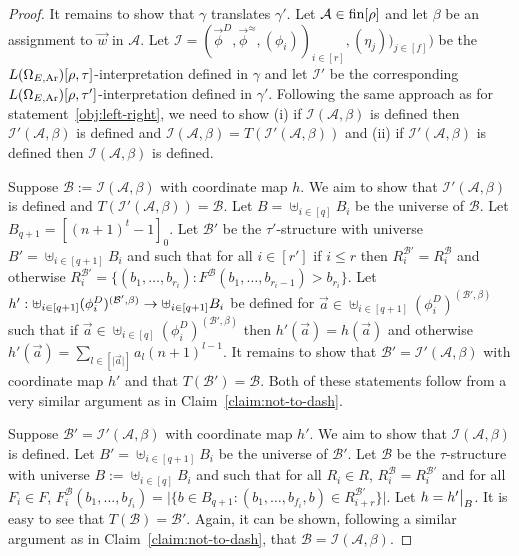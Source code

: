 \documentclass[../main/thesis.tex]{subfiles}
\begin{document}
\begin{proof}
  It remains to show that $\gamma$ translates $\gamma'$. Let $\mathcal{A} \in
  \text{\upshape fin}{[\rho]}$ and let $\beta$ be an assignment to $\vec{w}$ in $\mathcal{A}$.
  Let $\mathcal{I} = (\vec{\phi}^D, \vec{\phi}^{\approx}, (\phi_i))_{i \in [r]},
  (\eta_j))_{j \in [f]})$ be the $L(\Omega_{E, \text{\upshape Ar}})[\rho, \tau]$-interpretation
  defined in $\gamma$ and let $\mathcal{I}'$ be the corresponding $L(\Omega_{E,
    \text{\upshape Ar}})[\rho, \tau']$-interpretation defined in $\gamma'$. Following the same
  approach as for statement~\ref{obj:left-right}, we need to show (i) if
  $\mathcal{I}(\mathcal{A}, \beta)$ is defined then $\mathcal{I}'(\mathcal{A},
  \beta)$ is defined and $\mathcal{I}(\mathcal{A}, \beta) =
  T(\mathcal{I}'(\mathcal{A}, \beta))$ and (ii) if $\mathcal{I}'(\mathcal{A},
  \beta)$ is defined then $\mathcal{I}(\mathcal{A}, \beta)$ is defined.

  Suppose $\mathcal{B} := \mathcal{I}(\mathcal{A}, \beta)$ with coordinate map
  $h$. We aim to show that $\mathcal{I}'(\mathcal{A}, \beta)$ is defined and
  $T(\mathcal{I}'(\mathcal{A}, \beta)) = \mathcal{B}$. Let $B = \uplus_{i \in
    [q]}B_i$ be the universe of $\mathcal{B}$. Let $B_{q + 1} = [(n + 1)^{t} -
  1]_0$. Let $\mathcal{B}'$ be the $\tau'$-structure with universe $B' =
  \uplus_{i \in [q+1]} B_i$ and such that for all $i \in [r']$ if $i \leq r$
  then $R^{\mathcal{B}'}_i = R^{\mathcal{B}}_i$ and otherwise
  $R^{\mathcal{B}'}_i = \{(b_1, \ldots, b_{r_i} ) : F^{\mathcal{B}} (b_1,
  \ldots, b_{r_i - 1}) > b_{r_i}\}$. Let $h' : \uplus_{i \in [q +
    1]}(\phi^D_i)^{(\mathcal{B}', \beta)} \rightarrow \uplus_{i \in [q+1]} B_i$ be
  defined for $\vec{a} \in \uplus_{i \in [q + 1]}(\phi^D_i)^{(\mathcal{B}',
    \beta)}$ such that if $\vec{a} \in \uplus_{i \in
    [q]}(\phi^D_i)^{(\mathcal{B}', \beta)}$ then $h'(\vec{a}) = h(\vec{a})$ and
  otherwise $h'(\vec{a}) = \sum_{l \in [\vert \vec{a} \vert]} a_l (n + 1)^{l -
    1}$. It remains to show that $\mathcal{B}' = \mathcal{I}'(\mathcal{A},
  \beta)$ with coordinate map $h'$ and that $T(\mathcal{B}') = \mathcal{B}$.
  Both of these statements follow from a very similar argument as in
  Claim~\ref{claim:not-to-dash}.

  Suppose $\mathcal{B}' = \mathcal{I}'(\mathcal{A}, \beta)$ with coordinate map
  $h'$. We aim to show that $\mathcal{I}(\mathcal{A}, \beta)$ is defined. Let
  $B' = \uplus_{i \in [q+1]} B_i$ be the universe of $\mathcal{B}'$. Let
  $\mathcal{B}$ be the $\tau$-structure with universe $B := \uplus_{i \in [q]}
  B_i$ and such that for all $R_i \in R$, $R^{\mathcal{B}}_i =
  R^{\mathcal{B}'}_i$ and for all $F_i \in F$, $F^{\mathcal{B}}_i (b_1, \ldots,
  b_{f_i})= \vert \{b \in B_{q + 1} : (b_1, \ldots, b_{f_i}, b) \in
  R^{\mathcal{B}'}_{i + r}\}\vert$. Let $h = \restr{h'}{B}$. It is easy to see
  that $T(\mathcal{B}) = \mathcal{B}'$. Again, it can be shown, following a
  similar argument as in Claim~\ref{claim:not-to-dash}, that $\mathcal{B} =
  \mathcal{I}(\mathcal{A}, \beta)$.


\end{proof}
\end{document}
